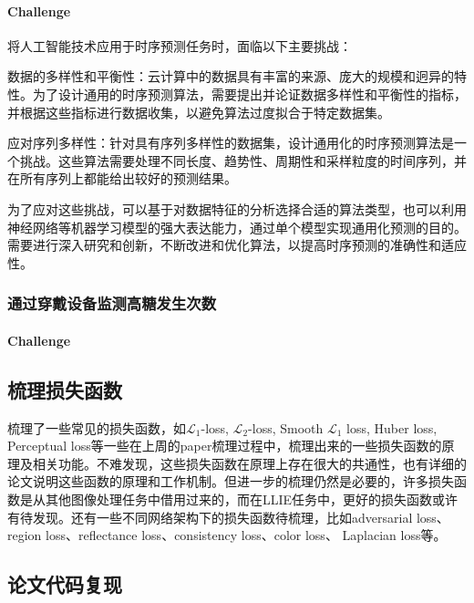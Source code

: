 \documentclass[letterpaper,12pt]{article}
\begin{document}
				\paragraph{Challenge}
				
				将人工智能技术应用于时序预测任务时，面临以下主要挑战：
				
				数据的多样性和平衡性：云计算中的数据具有丰富的来源、庞大的规模和迥异的特性。为了设计通用的时序预测算法，需要提出并论证数据多样性和平衡性的指标，并根据这些指标进行数据收集，以避免算法过度拟合于特定数据集。
				
				应对序列多样性：针对具有序列多样性的数据集，设计通用化的时序预测算法是一个挑战。这些算法需要处理不同长度、趋势性、周期性和采样粒度的时间序列，并在所有序列上都能给出较好的预测结果。
				
				为了应对这些挑战，可以基于对数据特征的分析选择合适的算法类型，也可以利用神经网络等机器学习模型的强大表达能力，通过单个模型实现通用化预测的目的。需要进行深入研究和创新，不断改进和优化算法，以提高时序预测的准确性和适应性。
				
			\subsubsection{通过穿戴设备监测高糖发生次数}
			
				\paragraph{Challenge}
				
				
					
		\subsection{梳理损失函数}
			
		梳理了一些常见的损失函数，如$\mathcal{L}_1$-loss, $\mathcal{L}_2$-loss, Smooth $\mathcal{L}_1$ loss, Huber loss, Perceptual loss等一些在上周的paper梳理过程中，梳理出来的一些损失函数的原理及相关功能。不难发现，这些损失函数在原理上存在很大的共通性，也有详细的论文说明这些函数的原理和工作机制。但进一步的梳理仍然是必要的，许多损失函数是从其他图像处理任务中借用过来的，而在LLIE任务中，更好的损失函数或许有待发现。还有一些不同网络架构下的损失函数待梳理，比如adversarial loss、region loss、reflectance loss、consistency loss、color loss、 Laplacian loss等。
		
	
		\subsection{论文代码复现}
		
\end{document}
